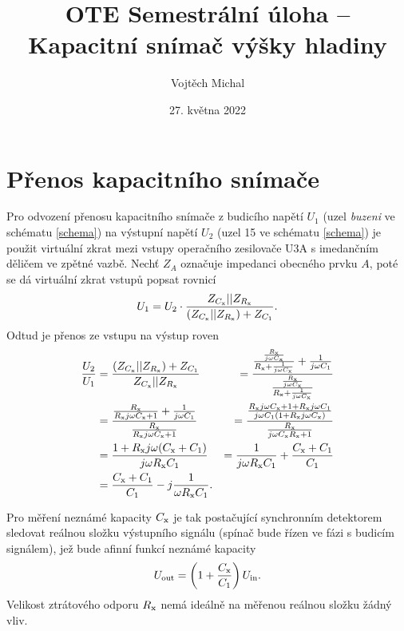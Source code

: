 \documentclass[twoside]{article}
\title{OTE Semestrální úloha -- Kapacitní snímač výšky hladiny}
\author{Vojtěch Michal}
\date{27. května 2022}
\newcommand{\Cx}{C_{\rm x}}
\newcommand{\Rx}{R_{\rm x}}
\begin{document}
\maketitle

\section{Přenos kapacitního snímače}

Pro odvození přenosu kapacitního snímače z
budicího napětí $U_1$ (uzel \textit{buzeni} ve schématu \ref{schema}) na výstupní napětí $U_2$ (uzel 15  ve schématu \ref{schema})
je použit virtuální zkrat mezi vstupy operačního zesilovače U3A
s imedančním děličem ve zpětné vazbě.
Nechť $Z_A$ označuje impedanci obecného prvku $A$, poté se dá virtuální zkrat vstupů popsat rovnicí
\begin{equation}
    U_1 = U_2 \cdot \frac{Z_{\Cx} || Z_{\Rx}}{(Z_{\Cx} || Z_{\Rx}) + Z_{C_1}}.
\end{equation}
Odtud je přenos ze vstupu na výstup roven
\begin{equation}
    \begin{aligned}
        \frac{U_2}{U_1} &= \frac{(Z_{\Cx} || Z_{\Rx}) + Z_{C_1}}{Z_{\Cx} || Z_{\Rx}} 
        &= \frac{\frac{\frac{\Rx}{j\omega \Cx}}{\Rx + \frac{1}{j\omega \Cx}} + \frac{1}{j\omega C_1}}{ \frac{\frac{\Rx}{j\omega \Cx}}{\Rx + \frac{1}{j\omega \Cx}}   } \\
        &= \frac{\frac{\Rx}{\Rx j\omega \Cx + 1} + \frac{1}{j\omega C_1}}{ \frac{\Rx}{\Rx j\omega \Cx + 1}   }
        &= \frac{\frac{\Rx j \omega \Cx + 1 + \Rx j \omega C_1}{j\omega C_1(1 + \Rx j\omega \Cx)}}{\frac{\Rx}{j\omega \Cx \Rx  + 1}} \\
        &= \frac{1 + \Rx j \omega (\Cx +C_1)}{j\omega \Rx C_1} 
        &= \frac{1}{j\omega \Rx C_1} + \frac{\Cx +C_1}{C_1} \\
        &= \frac{\Cx + C_1}{C_1} - j \frac{1}{\omega \Rx C_1}.
    \end{aligned}
\end{equation}

Pro měření neznámé kapacity $\Cx$ je tak postačující synchronním detektorem
sledovat reálnou složku výstupního signálu (spínač bude řízen ve fázi s budicím signálem),
jež bude afinní funkcí neznámé kapacity
\begin{equation}
    U_{\rm out} = \left(1 + \frac{\Cx}{C_1}\right) U_{\rm in}.
    \label{eq:zesileni}
\end{equation}
Velikost ztrátového odporu $\Rx$ nemá ideálně na měřenou reálnou složku žádný vliv.
\end{document}
